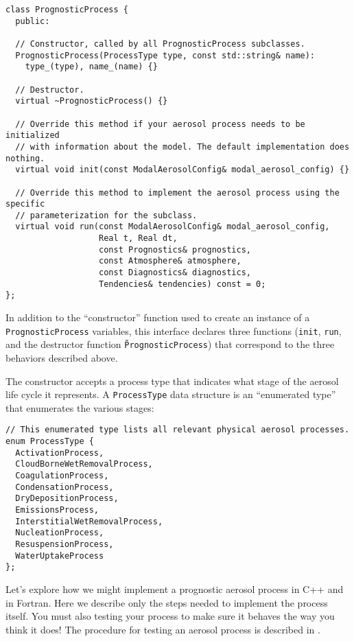 \begin{lstlisting}
class PrognosticProcess {
  public:

  // Constructor, called by all PrognosticProcess subclasses.
  PrognosticProcess(ProcessType type, const std::string& name):
    type_(type), name_(name) {}

  // Destructor.
  virtual ~PrognosticProcess() {}

  // Override this method if your aerosol process needs to be initialized
  // with information about the model. The default implementation does nothing.
  virtual void init(const ModalAerosolConfig& modal_aerosol_config) {}

  // Override this method to implement the aerosol process using the specific
  // parameterization for the subclass.
  virtual void run(const ModalAerosolConfig& modal_aerosol_config,
                   Real t, Real dt,
                   const Prognostics& prognostics,
                   const Atmosphere& atmosphere,
                   const Diagnostics& diagnostics,
                   Tendencies& tendencies) const = 0;
};
\end{lstlisting}

In addition to the ``constructor'' function used to create an instance of a
\texttt{PrognosticProcess} variables, this interface declares three functions
(\texttt{init}, \texttt{run}, and the destructor function \texttt{\~PrognosticProcess})
that correspond to the three behaviors described above.

The constructor accepts a process type that indicates what stage of the aerosol
life cycle it represents. A \texttt{ProcessType} data structure is an
``enumerated type'' that enumerates the various stages:

\begin{lstlisting}
// This enumerated type lists all relevant physical aerosol processes.
enum ProcessType {
  ActivationProcess,
  CloudBorneWetRemovalProcess,
  CoagulationProcess,
  CondensationProcess,
  DryDepositionProcess,
  EmissionsProcess,
  InterstitialWetRemovalProcess,
  NucleationProcess,
  ResuspensionProcess,
  WaterUptakeProcess
};
\end{lstlisting}

Let's explore how we might implement a prognostic aerosol process in C++ and in
Fortran. Here we describe only the steps needed to implement the process itself.
You must also testing your process to make sure it behaves the way you think it
does! The procedure for testing an aerosol process is described in
.

